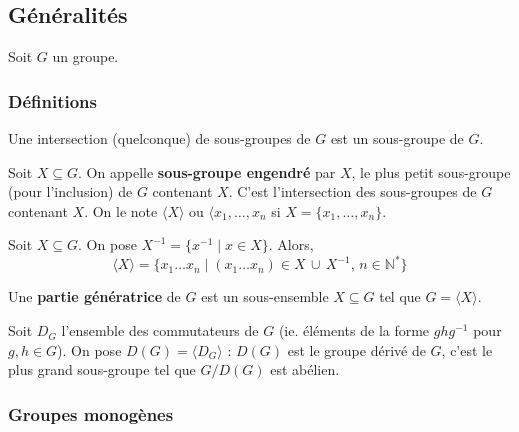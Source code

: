 




  \subsection{Généralités}

  Soit $G$ un groupe.

  \subsubsection{Définitions}


  \begin{lemma}
    Une intersection (quelconque) de sous-groupes de $G$ est un sous-groupe de $G$.
  \end{lemma}

  \begin{definition}
    Soit $X \subseteq G$. On appelle \textbf{sous-groupe engendré} par $X$, le plus petit sous-groupe (pour l'inclusion) de $G$ contenant $X$. C'est l'intersection des sous-groupes de $G$ contenant $X$. On le note $\langle X \rangle$ ou $\langle x_1, \dots, x_n$ si $X = \{ x_1, \dots, x_n \}$.
  \end{definition}

  \begin{proposition}
    Soit $X \subseteq G$. On pose $X^{-1} = \{ x^{-1} \mid x \in X \}$. Alors,
    \[ \langle X \rangle = \{ x_1 \dots x_n \mid (x_1 \dots x_n) \in X \, \cup \, X^{-1}, \, n \in \mathbb{N}^* \} \]
  \end{proposition}

  \begin{definition}
    Une \textbf{partie génératrice} de $G$ est un sous-ensemble $X \subseteq G$ tel que $G = \langle X \rangle$.
  \end{definition}

  \begin{example}
    Soit $D_G$ l'ensemble des commutateurs de $G$ (ie. éléments de la forme $ghg^{-1}$ pour $g,h \in G$). On pose $D(G) = \langle D_G \rangle$ : $D(G)$ est le groupe dérivé de $G$, c'est le plus grand sous-groupe tel que $G/D(G)$ est abélien.
  \end{example}

  \subsubsection{Groupes monogènes}

